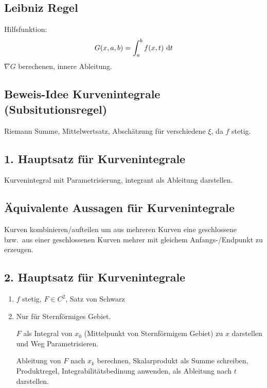  \subsection{Leibniz Regel}
 Hilfsfunktion:
 \begin{equation*}
     G(x,a,b) = \int_a^b f(x,t) \text{ d}t
 \end{equation*}
 $\nabla G$ berechenen, innere Ableitung.

 \subsection{Beweis-Idee Kurvenintegrale (Subsitutionsregel)}
 Riemann Summe, Mittelwertsatz, Abschätzung für verschiedene $\xi$, da $f$ stetig.

 \subsection{1. Hauptsatz für Kurvenintegrale}
 Kurvenintegral mit Parametrisierung, integrant als Ableitung darstellen.

 \subsection{Äquivalente Aussagen für Kurvenintegrale}
 Kurven kombinieren/aufteilen um aus mehreren Kurven eine geschlossene bzw.\ aus
 einer geschlossenen Kurven mehrer mit gleichem Anfangs-/Endpunkt zu erzeugen.

 \subsection{2. Hauptsatz für Kurvenintegrale}
 \begin{enumerate}
     \item $f$ stetig, $F \in C^2$, Satz von Schwarz
     \item Nur für Sternförmiges Gebiet.

        $F$ als Integral von $x_0$ (Mittelpunkt von Sternförmigem Gebiet) zu $x$
        darstellen und Weg Parametrisieren.

        Ableitung von $F$ nach $x_k$ berechnen, Skalarprodukt als Summe schreiben,
        Produktregel, Integrabilitätsbedinung anwenden, als Ableitung nach $t$
        darstellen.
 \end{enumerate}

